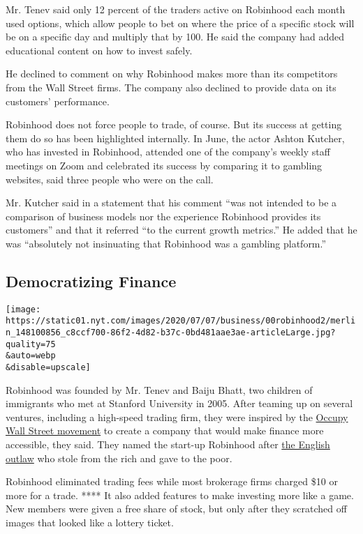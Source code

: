 Mr. Tenev said only 12 percent of the traders active on Robinhood each
month used options, which allow people to bet on where the price of a
specific stock will be on a specific day and multiply that by 100. He
said the company had added educational content on how to invest safely.

He declined to comment on why Robinhood makes more than its competitors
from the Wall Street firms. The company also declined to provide data on
its customers' performance.

Robinhood does not force people to trade, of course. But its success at
getting them do so has been highlighted internally. In June, the actor
Ashton Kutcher, who has invested in Robinhood, attended one of the
company's weekly staff meetings on Zoom and celebrated its success by
comparing it to gambling websites, said three people who were on the
call.

Mr. Kutcher said in a statement that his comment ``was not intended to
be a comparison of business models nor the experience Robinhood provides
its customers'' and that it referred ``to the current growth metrics.''
He added that he was ``absolutely not insinuating that Robinhood was a
gambling platform.''

\hypertarget{democratizing-finance}{%
\subsection{Democratizing Finance}\label{democratizing-finance}}

\texttt{[image: https://static01.nyt.com/images/2020/07/07/business/00robinhood2/merlin\_148100856\_c8ccf700-86f2-4d82-b37c-0bd481aae3ae-articleLarge.jpg?quality=75\\\&auto=webp\\\&disable=upscale]}

Robinhood was founded by Mr. Tenev and Baiju Bhatt, two children of
immigrants who met at Stanford University in 2005. After teaming up on
several ventures, including a high-speed trading firm, they were
inspired by the
\href{https://www.nytimes.com/topic/organization/occupy-movement-occupy-wall-street}{Occupy
Wall Street movement} to create a company that would make finance more
accessible, they said. They named the start-up Robinhood after
\href{https://en.wikipedia.org/wiki/Robin_Hood}{the English outlaw} who
stole from the rich and gave to the poor.

Robinhood eliminated trading fees while most brokerage firms charged
\$10 or more for a trade. **** It also added features to make investing
more like a game. New members were given a free share of stock, but only
after they scratched off images that looked like a lottery ticket.


